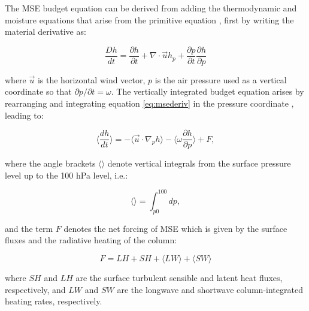 The MSE budget equation can be derived from adding the thermodynamic and moisture equations that arise from the primitive equation \citep{neelin2005}, first by writing the material derivative as:

\begin{equation}
\frac{Dh}{dt}=\frac{\partial h}{\partial t}+\nabla\cdot{\vec{u}h}_p+\frac{\partial p}{\partial t}\frac{\partial h}{\partial p}
\label{eq:msederiv}
\end{equation}

\noindent where $\vec{u}$ is the horizontal wind vector, $p$ is the air pressure used as a vertical coordinate so that $\partial p/\partial t = \omega$. 
The vertically integrated budget equation arises by rearranging and integrating equation \ref{eq:msederiv} in the pressure coordinate \citep{back2006,inoue2015,annamalai2020}, leading to:

\begin{equation}
\Bigg\langle \frac{d h}{dt} \Bigg\rangle=-\Bigg\langle \vec{u}\cdot\nabla _p h  \Bigg\rangle -\Bigg\langle \omega\frac{\partial h}{\partial p}\Bigg\rangle + F,
\label{eq:msebudget}
\end{equation}

\noindent where the angle brackets $\langle \rangle$ denote vertical integrals from the surface pressure level up to the 100 hPa level, i.e.:

\begin{equation}
\Bigg\langle \Bigg\rangle= \int_{p0}^{100} dp, 
\end{equation}

\noindent and the term $F$ denotes the net forcing of MSE which is given by the surface fluxes and the radiative heating of the column:

\begin{equation}
F= LH+SH+\langle LW \rangle + \langle  SW \rangle
\end{equation}

\noindent where $SH$ and $LH$ are the surface turbulent sensible and latent heat fluxes, respectively, and $LW$ and $SW$ are the longwave and shortwave column-integrated heating rates, respectively.


%
%
